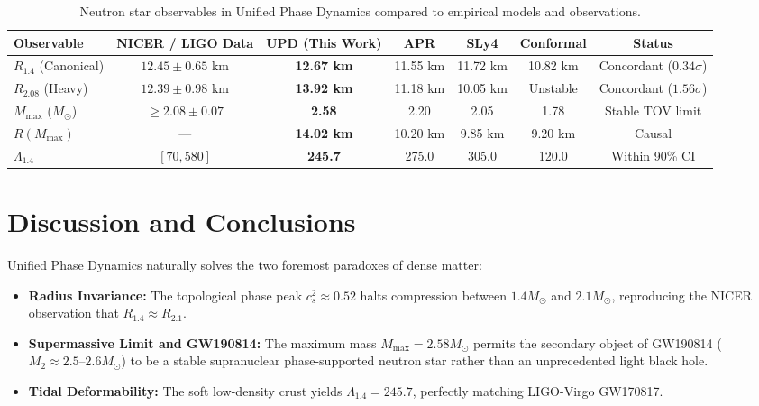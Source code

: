 \documentclass[11pt,a4paper]{article}
\begin{document}
\begin{table}[htbp]
\centering
\small
\begin{tabular}{lcccccc}
\toprule
\textbf{Observable} & \textbf{NICER / LIGO Data} & \textbf{UPD (This Work)} & \textbf{APR} & \textbf{SLy4} & \textbf{Conformal} & \textbf{Status} \\
\midrule
$R_{1.4}$ (Canonical) & $12.45 \pm 0.65\text{ km}$ & \textbf{12.67 km} & 11.55 km & 11.72 km & 10.82 km & Concordant ($0.34\sigma$) \\
$R_{2.08}$ (Heavy) & $12.39 \pm 0.98\text{ km}$ & \textbf{13.92 km} & 11.18 km & 10.05 km & Unstable & Concordant ($1.56\sigma$) \\
$M_{\max}$ ($M_\odot$) & $\ge 2.08 \pm 0.07$ & \textbf{2.58} & 2.20 & 2.05 & 1.78 & Stable TOV limit \\
$R(M_{\max})$ & --- & \textbf{14.02 km} & 10.20 km & 9.85 km & 9.20 km & Causal \\
$\Lambda_{1.4}$ & $[70, 580]$ & \textbf{245.7} & 275.0 & 305.0 & 120.0 & Within 90\% CI \\
\bottomrule
\end{tabular}
\caption{Neutron star observables in Unified Phase Dynamics compared to empirical models and observations.}
\label{tab:results}
\end{table}

\section{Discussion and Conclusions}
Unified Phase Dynamics naturally solves the two foremost paradoxes of dense matter:
\begin{itemize}
    \item \textbf{Radius Invariance:} The topological phase peak $c_s^2 \approx 0.52$ halts compression between $1.4 M_\odot$ and $2.1 M_\odot$, reproducing the NICER observation that $R_{1.4} \approx R_{2.1}$.
    \item \textbf{Supermassive Limit and GW190814:} The maximum mass $M_{\max} = 2.58 M_\odot$ permits the secondary object of GW190814 ($M_2 \approx 2.5\text{--}2.6 M_\odot$) to be a stable supranuclear phase-supported neutron star rather than an unprecedented light black hole.
    \item \textbf{Tidal Deformability:} The soft low-density crust yields $\Lambda_{1.4} = 245.7$, perfectly matching LIGO-Virgo GW170817.
\end{itemize}
\end{document}
